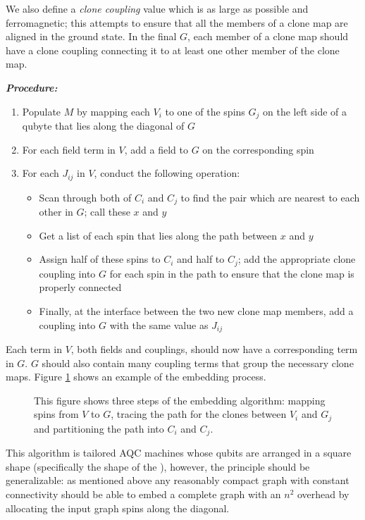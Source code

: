 We also define a \emph{clone coupling} value which is as large as possible and ferromagnetic; this attempts to ensure that all the members of a clone map are aligned in the ground state.  In the final $G$, each member of a clone map should have a clone coupling connecting it to at least one other member of the clone map.

\emph{\textbf{Procedure:}}
\begin{enumerate}
	\item Populate $M$ by mapping each $V_i$ to one of the spins $G_j$ on the left side of a qubyte that lies along the diagonal of $G$
	\item For each field term in $V$, add a field to $G$ on the corresponding spin
	\item For each $J_{ij}$ in $V$, conduct the following operation:
		\begin{itemize}
			\item Scan through both of $C_i$ and $C_j$ to find the pair which are nearest to each other in $G$; call these $x$ and $y$
			\item Get a list of each spin that lies along the path between $x$ and $y$
			\item Assign half of these spins to $C_i$ and half to $C_j$; add the appropriate clone coupling into $G$ for each spin in the path to ensure that the clone map is properly connected
			\item Finally, at the interface between the two new clone map members, add a coupling into $G$ with the same value as $J_{ij}$
		\end{itemize}
\end{enumerate}

Each term in $V$, both fields and couplings, should now have a corresponding term in $G$.  $G$ should also contain many coupling terms that group the necessary clone maps.  Figure \ref{fig:embedding} shows an example of the embedding process.


\begin{figure}
	\caption[Embedding Algorithm]{This figure shows three steps of the embedding algorithm: mapping spins from $V$ to $G$, tracing the path for the clones between $V_i$ and $G_j$ and partitioning the path into $C_i$ and $C_j$.}
	\label{fig:embedding}
\end{figure}

This algorithm is tailored AQC machines whose qubits are arranged in a square shape (specifically the shape of the \machine), however, the principle should be generalizable: as mentioned above any reasonably compact graph with constant connectivity should be able to embed a complete graph with an $n^2$ overhead by allocating the input graph spins along the diagonal.
